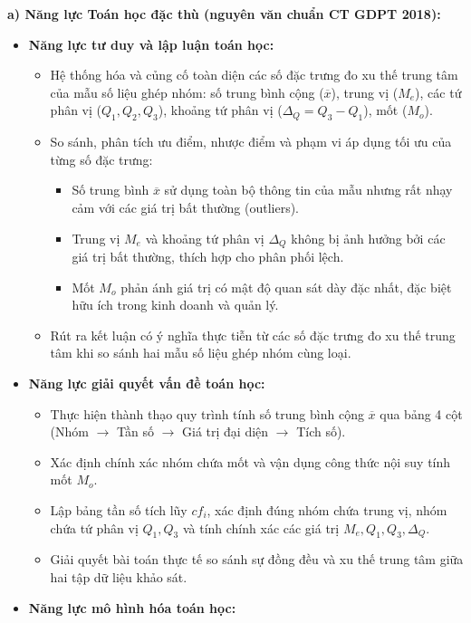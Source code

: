 \documentclass[12pt, a4paper]{article}
\begin{document}
\textbf{a) Năng lực Toán học đặc thù (nguyên văn chuẩn CT GDPT 2018):}
\begin{itemize}[leftmargin=1.5em]
    \item \textbf{Năng lực tư duy và lập luận toán học:}
    \begin{itemize}
        \item Hệ thống hóa và củng cố toàn diện các số đặc trưng đo xu thế trung tâm của mẫu số liệu ghép nhóm: số trung bình cộng ($\overline{x}$), trung vị ($M_e$), các tứ phân vị ($Q_1, Q_2, Q_3$), khoảng tứ phân vị ($\Delta_Q = Q_3 - Q_1$), mốt ($M_o$).
        \item So sánh, phân tích ưu điểm, nhược điểm và phạm vi áp dụng tối ưu của từng số đặc trưng:
        \begin{itemize}
            \item Số trung bình $\overline{x}$ sử dụng toàn bộ thông tin của mẫu nhưng rất nhạy cảm với các giá trị bất thường (outliers).
            \item Trung vị $M_e$ và khoảng tứ phân vị $\Delta_Q$ không bị ảnh hưởng bởi các giá trị bất thường, thích hợp cho phân phối lệch.
            \item Mốt $M_o$ phản ánh giá trị có mật độ quan sát dày đặc nhất, đặc biệt hữu ích trong kinh doanh và quản lý.
        \end{itemize}
        \item Rút ra kết luận có ý nghĩa thực tiễn từ các số đặc trưng đo xu thế trung tâm khi so sánh hai mẫu số liệu ghép nhóm cùng loại.
    \end{itemize}
    \item \textbf{Năng lực giải quyết vấn đề toán học:}
    \begin{itemize}
        \item Thực hiện thành thạo quy trình tính số trung bình cộng $\overline{x}$ qua bảng 4 cột (Nhóm $\to$ Tần số $\to$ Giá trị đại diện $\to$ Tích số).
        \item Xác định chính xác nhóm chứa mốt và vận dụng công thức nội suy tính mốt $M_o$.
        \item Lập bảng tần số tích lũy $cf_i$, xác định đúng nhóm chứa trung vị, nhóm chứa tứ phân vị $Q_1, Q_3$ và tính chính xác các giá trị $M_e, Q_1, Q_3, \Delta_Q$.
        \item Giải quyết bài toán thực tế so sánh sự đồng đều và xu thế trung tâm giữa hai tập dữ liệu khảo sát.
    \end{itemize}
    \item \textbf{Năng lực mô hình hóa toán học:}

\end{itemize}
\end{document}
